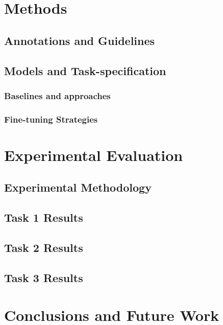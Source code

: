 \documentclass[acmtog]{acmart}
\begin{document}
\section{Methods}
\label{sec:methods}

\subsection{Annotations and Guidelines}


\subsection{Models and Task-specification}
\label{sec:models}

\subsubsection{Baselines and approaches}
\label{sec:model-families}

\subsubsection{Fine-tuning Strategies}
\label{sec:fine-tuning}

\section{Experimental Evaluation}

\subsection{Experimental Methodology}

\subsection{Task 1 Results}
\label{sec:joint-results}

\subsection{Task 2 Results}
\label{sec:error-analysis}

\subsection{Task 3 Results}
\label{sec:error-analysis}

\section{Conclusions and Future Work}
\end{document}
